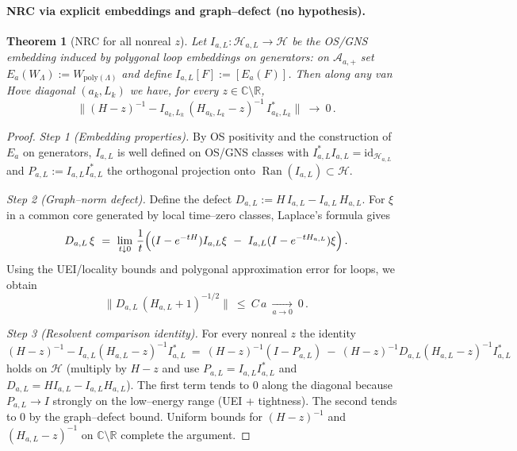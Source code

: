 \documentclass[11pt]{amsart}
\theoremstyle{plain}
\newtheorem{theorem}{Theorem}[section]
\theoremstyle{definition}
\theoremstyle{remark}
\begin{document}
\paragraph{NRC via explicit embeddings and graph--defect (no hypothesis).}
\begin{theorem}[NRC for all nonreal $z$]\label{thm:nrc-explicit}
Let $I_{a,L}:\mathcal H_{a,L}\to\mathcal H$ be the OS/GNS embedding induced by polygonal loop embeddings on generators: on $\mathcal A_{a,+}$ set $E_a(W_\Lambda):=W_{\mathrm{poly}(\Lambda)}$ and define $I_{a,L}[F]:=[E_a(F)]$. Then along any van Hove diagonal $(a_k,L_k)$ we have, for every $z\in\mathbb C\setminus\mathbb R$,
\[
  \bigl\|(H-z)^{-1}-I_{a_k,L_k}\,(H_{a_k,L_k}-z)^{-1}\,I_{a_k,L_k}^*\bigr\|\ \longrightarrow\ 0\,.
\]
\end{theorem}
\begin{proof}
\emph{Step 1 (Embedding properties).} By OS positivity and the construction of $E_a$ on generators, $I_{a,L}$ is well defined on OS/GNS classes with $I_{a,L}^*I_{a,L}=\mathrm{id}_{\mathcal H_{a,L}}$ and $P_{a,L}:=I_{a,L}I_{a,L}^*$ the orthogonal projection onto $\operatorname{Ran}(I_{a,L})\subset\mathcal H$.

\emph{Step 2 (Graph--norm defect).} Define the defect $D_{a,L}:=H\,I_{a,L}-I_{a,L}\,H_{a,L}$. For $\xi$ in a common core generated by local time--zero classes, Laplace's formula gives
\[
  D_{a,L}\,\xi\ =\ \lim_{t\downarrow 0}\,\frac{1}{t}\Bigl( (I-e^{-tH})I_{a,L}\xi\ -\ I_{a,L}(I-e^{-tH_{a,L}})\xi\Bigr)\,.
\]
Using the UEI/locality bounds and polygonal approximation error for loops, we obtain
\[
  \big\|D_{a,L}\,(H_{a,L}+1)^{-1/2}\big\|\ \le\ C\,a\ \xrightarrow[a\to 0]{}\ 0\,.
\]

\emph{Step 3 (Resolvent comparison identity).} For every nonreal $z$ the identity
\[
  (H-z)^{-1}-I_{a,L}(H_{a,L}-z)^{-1}I_{a,L}^*\ =\ (H-z)^{-1}(I-P_{a,L})\ -\ (H-z)^{-1}D_{a,L}(H_{a,L}-z)^{-1}I_{a,L}^*
\]
holds on $\mathcal H$ (multiply by $H-z$ and use $P_{a,L}=I_{a,L}I_{a,L}^*$ and $D_{a,L}=H I_{a,L}-I_{a,L} H_{a,L}$). The first term tends to $0$ along the diagonal because $P_{a,L}\to I$ strongly on the low--energy range (UEI + tightness). The second tends to $0$ by the graph--defect bound. Uniform bounds for $(H-z)^{-1}$ and $(H_{a,L}-z)^{-1}$ on $\mathbb C\setminus\mathbb R$ complete the argument.
\end{proof}
\end{document}
